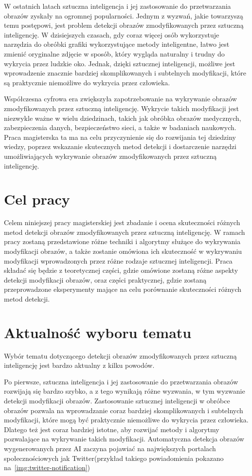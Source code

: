 W ostatnich latach sztuczna inteligencja i jej zastosowanie do przetwarzania obrazów zyskały na ogromnej popularności.
Jednym z wyzwań, jakie towarzyszą temu postępowi, jest problem detekcji obrazów zmodyfikowanych przez sztuczną inteligencję.
W dzisiejszych czasach, gdy coraz więcej osób wykorzystuje narzędzia do obróbki grafiki wykorzystujące metody inteligentne, łatwo jest zmienić oryginalne zdjęcie w sposób, który wygląda naturalny i trudny do wykrycia przez ludzkie oko.
Jednak, dzięki sztucznej inteligencji, możliwe jest wprowadzenie znacznie bardziej skomplikowanych i subtelnych modyfikacji, które są praktycznie niemożliwe do wykrycia przez człowieka.


Współczesna cyfrowa era zwiększyła zapotrzebowanie na wykrywanie obrazów zmodyfikowanych przez sztuczną inteligencję.
Wykrycie takich modyfikacji jest niezwykle ważne w wielu dziedzinach, takich jak obróbka obrazów medycznych, zabezpieczenia danych, bezpieczeństwo sieci, a także w badaniach naukowych.
Praca magisterska ta ma na celu przyczynienie się do rozwijania tej dziedziny wiedzy, poprzez wskazanie skutecznych metod detekcji i dostarczenie narzędzi umożliwiających wykrywanie obrazów zmodyfikowanych przez sztuczną inteligencję.


\section{Cel pracy}
Celem niniejszej pracy magisterskiej jest zbadanie i ocena skuteczności różnych metod detekcji obrazów zmodyfikowanych przez sztuczną inteligencję.
W ramach pracy zostaną przedstawione różne techniki i algorytmy służące do wykrywania modyfikacji obrazów, a także zostanie omówiona ich skuteczność w wykrywaniu modyfikacji wprowadzonych przez różne rodzaje sztucznej inteligencji.
Praca składać się będzie z teoretycznej części, gdzie omówione zostaną różne aspekty detekcji modyfikacji obrazów, oraz części praktycznej, gdzie zostaną przeprowadzone eksperymenty mające na celu porównanie skuteczności różnych metod detekcji.


\section{Aktualność wyboru tematu}
Wybór tematu dotyczącego detekcji obrazów zmodyfikowanych przez sztuczną inteligencję jest bardzo aktualny z kilku powodów.

Po pierwsze, sztuczna inteligencja i jej zastosowanie do przetwarzania obrazów rozwijają się bardzo szybko, a z tego wynikają różne wyzwania, w tym wyzwanie detekcji modyfikacji obrazów.
Zastosowanie sztucznej inteligencji w obróbce obrazów pozwala na wprowadzanie coraz bardziej skomplikowanych i subtelnych modyfikacji, które mogą być praktycznie niemożliwe do wykrycia przez człowieka.
Dlatego też jest coraz bardziej istotne, aby rozwijać metody i algorytmy pozwalające na wykrywanie takich modyfikacji.
Automatyczna detekcja obrazów wygenerowanych przez AI zaczyna pojawiać na największych portalach społecznościowych jak Twitter(przykład takiego powiadomienia pokazano na~\ref{img:twitter-notification})

